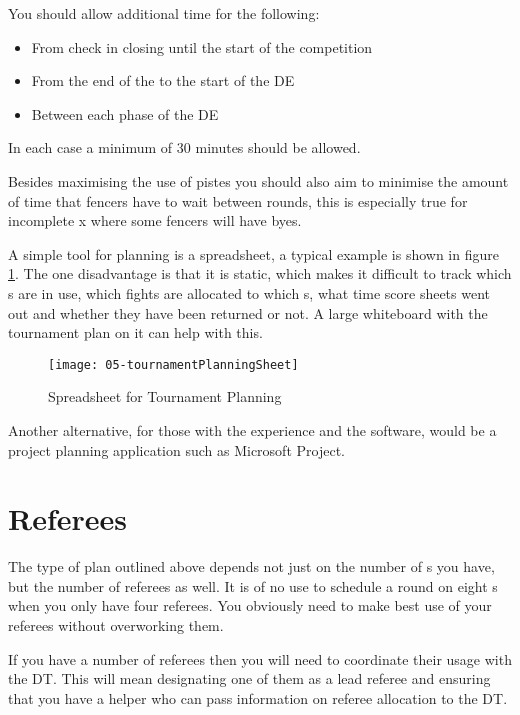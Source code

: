 \documentclass[a4paper,11pt]{memoir}
\begin{document}
You should allow additional time for the following:

\begin{itemize}
 \item From check in closing until the start of the competition
 \item From the end of the  to the start of the DE
 \item Between each phase of the DE
\end{itemize}

In each case a minimum of 30 minutes should be allowed.

Besides maximising the use of pistes you should also aim to minimise the amount of time that fencers have to wait between rounds, this is especially true for incomplete x where some fencers will have byes.

A simple tool for planning  is a spreadsheet, a typical example is shown in figure \ref{fig:05-tournamentPlanningSheet}. The one disadvantage is that it is static, which makes it difficult to track which s are in use, which fights are allocated to which s, what time score sheets went out and whether they have been returned or not. A large whiteboard with the tournament plan on it can help with this.

\begin{figure}[!ht]
 \centering
 \texttt{[image: 05-tournamentPlanningSheet]}
 \caption{Spreadsheet for Tournament Planning} \label{fig:05-tournamentPlanningSheet}
\end{figure}

Another alternative, for those with the experience and the software, would be a project planning application such as Microsoft Project.

\section{Referees}

The type of plan outlined above depends not just on the number of s you have, but the number of referees as well. It is of no use to schedule a round on eight s when you only have four referees. You obviously need to make best use of your referees without overworking them.

If you have a number of referees then you will need to coordinate their usage with the DT. This will mean designating one of them as a lead referee and ensuring that you have a helper who can pass information on referee allocation to the DT.
\end{document}
